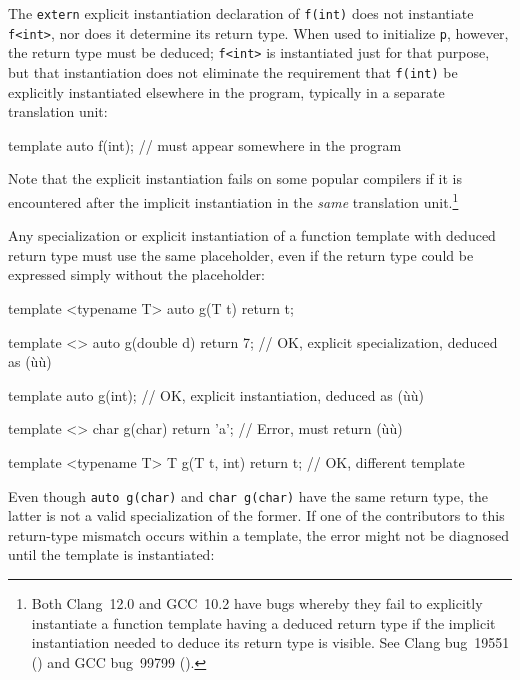 \noindent The \lstinline!extern! explicit instantiation declaration of
\lstinline!f(int)! does not instantiate \lstinline!f<int>!, nor does it
determine its return type. When used to initialize \lstinline!p!, however,
the return type must be deduced; \lstinline!f<int>! is instantiated just
for that purpose, but that instantiation does not eliminate the
requirement that \lstinline!f(int)! be explicitly instantiated elsewhere in
the program, typically in a separate translation unit:

\begin{emcppslisting}
template auto f(int); // must appear somewhere in the program
\end{emcppslisting}
    

\noindent Note that the explicit instantiation fails on some popular compilers if
it is encountered after the implicit instantiation in the \emph{same}
translation unit.{\cprotect\footnote{Both Clang~12.0 and GCC~10.2 have
bugs whereby they fail to explicitly instantiate a function template
having a deduced return type if the implicit instantiation needed to
deduce its return type is visible. See Clang bug~19551
(\cite{halpern21b}) and GCC bug~99799
  (\cite{halpern21a}).}}

Any specialization or explicit instantiation of a function template with
deduced return type must use the same placeholder, even if the return
type could be expressed simply without the placeholder:

\begin{emcppslisting}
template <typename T> auto g(T t) { return t; }

template <>
auto g(double d) { return 7; }  // OK, explicit specialization, deduced as (ù{}ù)

template auto g(int);           // OK, explicit instantiation, deduced as (ù{}ù)

template <>
char g(char)   { return 'a'; }  // Error, must return (ù{}ù)

template <typename T>
T    g(T t, int) { return t; }  // OK, different template
\end{emcppslisting}
    

\noindent Even though \lstinline!auto!~\lstinline!g(char)! and
\lstinline!char!~\lstinline!g(char)! have the same return type, the latter is
not a valid specialization of the former. If one of the contributors to
this return-type mismatch occurs within a template, the error might not
be diagnosed until the template is instantiated:

